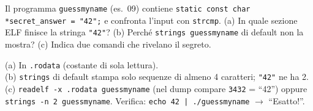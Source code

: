 \question[6]
Il programma \lstinline|guessmyname| (es.\ 09) contiene \lstinline|static const char *secret_answer = "42";| e confronta l'input con \lstinline|strcmp|.
(a) In quale sezione ELF finisce la stringa \lstinline|"42"|? (b) Perché \lstinline|strings guessmyname| di default non la mostra? (c) Indica due comandi che rivelano il segreto.
\begin{solution}
(a) In \lstinline|.rodata| (costante di sola lettura).\\
(b) \lstinline|strings| di default stampa solo sequenze di almeno 4 caratteri; \lstinline|"42"| ne ha 2.\\
(c) \lstinline|readelf -x .rodata guessmyname| (nel dump compare \lstinline|3432| = ``42'') oppure \lstinline|strings -n 2 guessmyname|. Verifica: \lstinline!echo 42 | ./guessmyname! $\to$ ``Esatto!''.
\end{solution}
